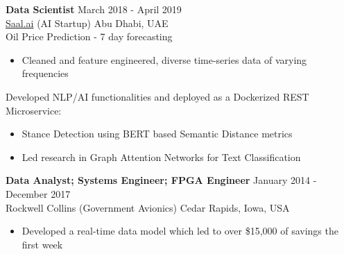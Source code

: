 \documentclass[margin, line]{res} %
\begin{document}
\begin{resume}
{\textbf{Data Scientist}} \hfill March 2018 - April 2019\\
\href{http://saal.ai/}{Saal.ai} (AI Startup) \hfill Abu Dhabi, UAE\\
Oil Price Prediction - 7 day forecasting
\begin{itemize} \itemsep -2pt %
\item Cleaned and feature engineered, diverse time-series data of varying frequencies
\end{itemize}
Developed NLP/AI functionalities and deployed as a Dockerized REST Microservice:
\begin{itemize} \itemsep -2pt %
\item Stance Detection using BERT based Semantic Distance metrics
\item Led research in Graph Attention Networks for Text Classification
\end{itemize}

{\textbf{Data Analyst; Systems Engineer; FPGA Engineer}} \hfill January 2014 - December 2017 \\
Rockwell Collins (Government Avionics) \hfill Cedar Rapids, Iowa, USA\\
\begin{itemize} \itemsep -2pt %
\item Developed a real-time data model which led to over \$15,000 of savings the first week
\end{itemize}


\end{resume}
\end{document}
